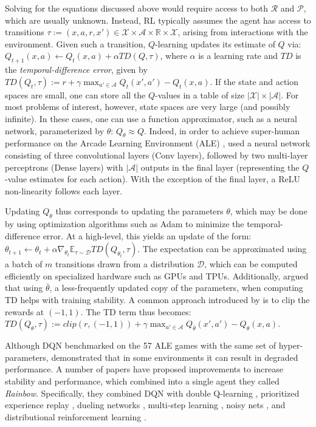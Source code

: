 \documentclass[10pt]{article} %
\begin{document}
Solving for the equations discussed above would require access to both $\mathcal{R}$ and $\mathcal{P}$, which are usually unknown. Instead, RL typically assumes the agent has access to transitions $\tau := (x, a, r, x')\in\mathcal{X}\times\mathcal{A}\times\mathbb{R}\times\mathcal{X}$, arising from interactions with the environment. Given such a transition,  $Q$-learning \citep{Watkins1992qlearning} updates its estimate of $Q$ via: $Q_{t+1}(x, a) \leftarrow  Q_t(x, a) + {\alpha} TD(Q, \tau)$, where {$\alpha$} is a learning rate and $TD$ is the {\em temporal-difference error}, given by $TD(Q_t, \tau) := r + \gamma \max_{a' \in\mathcal{A}} Q_t(x', a') - Q_t(x, a)$. If the state and action spaces are small, one can store all the $Q$-values in a table of size $|\mathcal{X}|\times |\mathcal{A}|$. For most problems of interest, however, state spaces are very large (and possibly infinite). In these cases, one can use a function approximator, such as a neural network, parameterized by $\theta$: $Q_\theta\approx Q$. Indeed, in order to achieve super-human performance on the Arcade Learning Environment (ALE) \citep{bellemare2012ale}, \citet{mnih2015humanlevel} used a neural network consisting of three convolutional layers (Conv layers), followed by two multi-layer perceptrons (Dense layers) with $|\mathcal{A}|$ outputs in the final layer (representing the $Q$-value estimates for each action). With the exception of the final layer, a ReLU non-linearity follows each layer.

Updating $Q_{\theta}$ thus corresponds to updating the parameters $\theta$, which may be done by using optimization algorithms such as Adam \citep{kingma15adam} to minimize the temporal-difference error. At a high-level, this yields an update of the form: $\theta_{t+1} \leftarrow \theta_t + \alpha\nabla_{\theta_t} \mathbb{E}_{\tau\sim\mathcal{D}} TD(Q_{\theta_t}, \tau)$.
The expectation can be approximated using a batch of $m$ transitions drawn from a distribution $\mathcal{D}$, which can be computed efficiently on specialized hardware such as GPUs and TPUs. Additionally, \citet{mnih2015humanlevel} argued that using $\bar{\theta}$, a less-frequently updated copy of the parameters, when computing TD helps with training stability. A common approach introduced by \citet{mnih2015humanlevel} is to clip the rewards at $(-1, 1)$. The TD term thus becomes:
  $TD(Q_{\theta}, \tau) := clip(r, (-1, 1)) + \gamma\max_{a'\in\mathcal{A}}Q_{\bar{\theta}}(x', a') - Q_{\theta}(x, a)$.

Although DQN benchmarked on the 57 ALE games with the same set of hyper-parameters, \citet{anschel2017averageddqn} 
demonstrated that in some environments it can result in degraded performance.
A number of papers have proposed improvements to increase stability and performance, which \citet{Hessel2018RainbowCI} combined into a single agent they called \emph{Rainbow}. Specifically, they combined DQN with double Q-learning \citep{hasselt2015doubledqn}, prioritized experience replay \citep{Schaul2016PrioritizedER}, dueling networks \citep{wang16dueling}, multi-step learning \citep{sutton88learning}, noisy nets \citep{fortunato18noisy}, and distributional reinforcement learning \citep{Bellemare2017ADP}.
\end{document}
